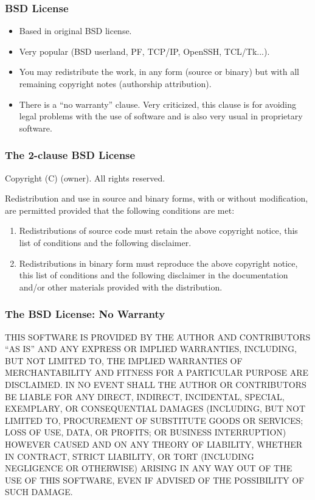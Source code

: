 
\begin{frame}
\frametitle{BSD License}

\begin{itemize}
\item Based in original BSD license.
\item Very popular (BSD userland, PF, TCP/IP, OpenSSH, TCL/Tk...).
\item You may redistribute the work, in any form (source or binary)
  but with all remaining copyright notes (authorship attribution).
\item There is a ``no warranty'' clause. Very criticized, this clause
  is for avoiding legal problems with the use of software and is also
  very usual in proprietary software.
\end{itemize}

\end{frame}



\begin{frame}
\frametitle{The 2-clause BSD License}

Copyright (C) (owner). All rights reserved.

Redistribution and use in source and binary forms, with or without
modification, are permitted provided that the following conditions
are met:

\begin{enumerate}
\item Redistributions of source code must retain the above copyright notice, this list of  conditions and the following disclaimer.
\item Redistributions in binary form must reproduce the above copyright notice, this list of conditions and the following disclaimer in the documentation and/or other materials provided with the distribution.
\end{enumerate}
 
\end{frame}


\begin{frame}
\frametitle{The BSD License: No Warranty}

{\small
THIS SOFTWARE IS PROVIDED BY THE AUTHOR AND CONTRIBUTORS ``AS IS'' 
AND ANY EXPRESS OR IMPLIED WARRANTIES, INCLUDING, BUT NOT LIMITED TO, 
THE IMPLIED WARRANTIES OF MERCHANTABILITY AND FITNESS FOR A PARTICULAR 
PURPOSE ARE DISCLAIMED. IN NO EVENT SHALL THE AUTHOR OR CONTRIBUTORS 
BE LIABLE FOR ANY DIRECT, INDIRECT, INCIDENTAL, SPECIAL, EXEMPLARY, 
OR CONSEQUENTIAL DAMAGES (INCLUDING, BUT NOT LIMITED TO, PROCUREMENT 
OF SUBSTITUTE GOODS OR SERVICES; LOSS OF USE, DATA, OR PROFITS; 
OR BUSINESS INTERRUPTION) HOWEVER CAUSED AND ON ANY THEORY OF LIABILITY, 
WHETHER IN CONTRACT, STRICT LIABILITY, OR TORT (INCLUDING NEGLIGENCE 
OR OTHERWISE) ARISING IN ANY WAY OUT OF THE USE OF THIS SOFTWARE, 
EVEN IF ADVISED OF THE POSSIBILITY OF SUCH DAMAGE.
}

\end{frame}


